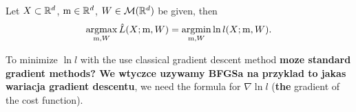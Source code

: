 \begin{corollary}\label{c2}
Let $X \subset \mathbb{R}^d$, $\mathrm{m} \in \mathbb{R}^d$, $W \in \mathcal{M}(\mathbb{R}^d)$ be given, then
$$
\operatorname*{argmax}_{\mathrm{m},W} \hat{L}(X;\mathrm{m},W) =  \operatorname*{argmin}_{\mathrm{m},W} \ln {l}(X;\mathrm{m},W).
$$
\end{corollary}


To minimize $\ln l$ with the use classical gradient descent method \textbf{moze standard gradient methods? We wtyczce uzywamy BFGSa na przyklad to jakas wariacja gradient descentu},  we need
the formula for $\nabla \ln l$ (\textbf{the} gradient of the cost function). 



